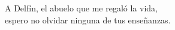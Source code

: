 \begin{dedication}
    A Delfín, el abuelo que me regaló la vida, \\  
    espero no olvidar ninguna 
    de tus enseñanzas.
\end{dedication}